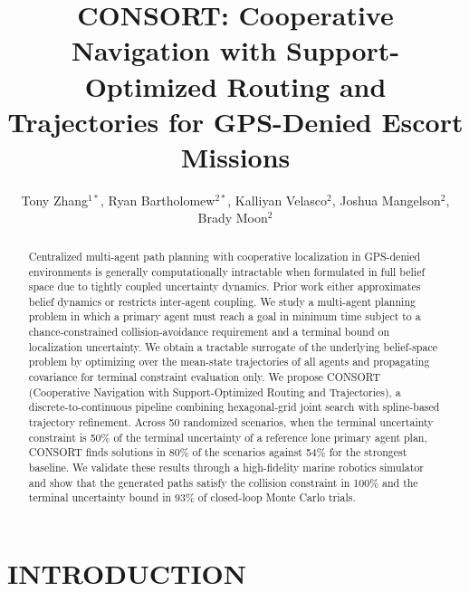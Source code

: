 \documentclass[letterpaper, 10 pt, conference]{ieeeconf}
\title{\LARGE \bf CONSORT: Cooperative Navigation with Support-Optimized Routing and Trajectories for GPS-Denied Escort Missions}
\author{Tony Zhang$^{1*}$, Ryan Bartholomew$^{2*}$, Kalliyan Velasco$^2$, Joshua Mangelson$^2$, Brady Moon$^2$}
\theoremstyle{remark}
\newcommand{\budget}[1]{\textcolor{RoyalBlue}{\bfseries [BUDGET: #1]}}
\begin{document}
\maketitle
\thispagestyle{empty}
\pagestyle{empty}

\begin{abstract}
Centralized multi-agent path planning with cooperative localization in GPS-denied environments is generally computationally 
intractable when formulated in full belief space due to tightly coupled uncertainty dynamics. Prior work either approximates belief dynamics
or restricts inter-agent coupling. We study a multi-agent planning problem in which a primary agent must reach a goal in minimum time 
subject to a chance-constrained collision-avoidance requirement and a terminal bound on localization uncertainty. We obtain a tractable surrogate
of the underlying belief-space problem by optimizing over the mean-state trajectories of all agents and propagating covariance for terminal constraint evaluation only. 
We propose CONSORT (Cooperative Navigation with Support-Optimized Routing and Trajectories), a discrete-to-continuous pipeline combining hexagonal-grid joint search with spline-based trajectory refinement. 
Across 50 randomized scenarios, when the terminal uncertainty constraint is 50\% of the terminal uncertainty of a reference lone primary agent plan, CONSORT
finds solutions in 80\% of the scenarios against 54\% for the strongest baseline. We validate these results through a high-fidelity marine robotics simulator and show that
the generated paths satisfy the collision constraint in 100\% and the terminal uncertainty bound in 93\% of closed-loop Monte Carlo trials.

\end{abstract}

\section{INTRODUCTION}
\end{document}
